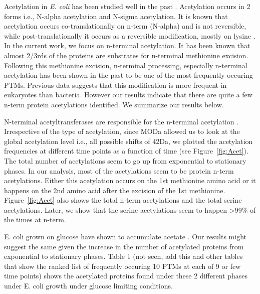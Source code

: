 \documentclass[12pt]{article}
\begin{document}
Acetylation in \emph{E. coli} has been studied well in the past \cite{Charbautetal2002} \cite{Gordiyenkoetal2008}. Acetylation occurs in 2 forms i.e., N-{alpha} acetylation and N-{sigma} acetylation. It is known that acetylation occurs co-translationally on n-term (N-{alpha}) and is not reversible, while post-translationally it occurs as a reversible modification, mostly on lysine \cite{Yuetal2008}. In the current work, we focus on n-terminal acetylation. It has been known that almost 2/3rds of the proteins are substrates for n-terminal methionine excision. Following this methionine excision, n-terminal processing, especially n-terminal acetylation \cite{Driessenetal1985} has been shown in the past to be one of the most frequently occuring PTMs. Previous data suggests that this modification is more frequent in eukaryotes than bacteria. However our results indicate that there are quite a few n-term protein acetylations identified. We summarize our results below. 

N-terminal acetyltransferases are responsible for the n-terminal acetylation \cite{Starheimetal2012}.  Irrespective of the type of acetylation, since MODa allowed us to look at the global acetylation level i.e., all possible shifts of 42Da, we plotted the acetylation frequencies at different time points as a function of time (see Figure~\ref{fig:Acet}). The total number of acetylations seem to go up from exponential to stationary phases. In our analysis, most of the acetylations seem to be protein n-term acetylations. Either this acetylation occurs on the 1st methionine amino acid or it happens on the 2nd amino acid after the excision of the 1st methionine. Figure~\ref{fig:Acet} also shows the total n-term acetylations and the total serine acetylations. Later, we show that the serine acetylations seem to happen >99\% of the times at n-term.

E. coli grown on glucose have shown to accumulate acetate \cite{Kuhnetal2014}. Our results might suggest the same given the increase in the number of acetylated proteins from exponential to stationary phases. Table 1 (not seen, add this and other tables that show the ranked list of frequently occuring 10 PTMs at each of 9 or few time points) shows the acetylated proteins found under these 2 different phases under E. coli growth under glucose limiting conditions.

\end{document}
